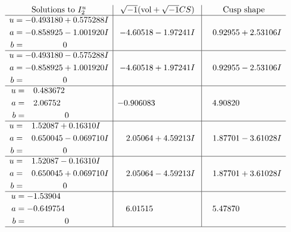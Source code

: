 \documentclass[1p]{elsarticle_modified}
\theoremstyle{definition}
\newcommand{\I}{\sqrt{-1}}
\begin{document}
$$\begin{array}{c|c|c}  
\text{Solutions to }I^u_{2}& \I (\text{vol} + \sqrt{-1}CS) & \text{Cusp shape}\\
 \hline 
\begin{aligned}
u &= -0.493180 + 0.575288 I \\
a &= -0.858925 - 1.001920 I \\
b &= \phantom{-0.000000 } 0\end{aligned}
 & -4.60518 - 1.97241 I & \phantom{-}0.92955 + 2.53106 I \\ \hline\begin{aligned}
u &= -0.493180 - 0.575288 I \\
a &= -0.858925 + 1.001920 I \\
b &= \phantom{-0.000000 } 0\end{aligned}
 & -4.60518 + 1.97241 I & \phantom{-}0.92955 - 2.53106 I \\ \hline\begin{aligned}
u &= \phantom{-}0.483672\phantom{ +0.000000I} \\
a &= \phantom{-}2.06752\phantom{ +0.000000I} \\
b &= \phantom{-0.000000 } 0\end{aligned}
 & -0.906083\phantom{ +0.000000I} & \phantom{-}4.90820\phantom{ +0.000000I} \\ \hline\begin{aligned}
u &= \phantom{-}1.52087 + 0.16310 I \\
a &= \phantom{-}0.650045 - 0.069710 I \\
b &= \phantom{-0.000000 } 0\end{aligned}
 & \phantom{-}2.05064 + 4.59213 I & \phantom{-}1.87701 - 3.61028 I \\ \hline\begin{aligned}
u &= \phantom{-}1.52087 - 0.16310 I \\
a &= \phantom{-}0.650045 + 0.069710 I \\
b &= \phantom{-0.000000 } 0\end{aligned}
 & \phantom{-}2.05064 - 4.59213 I & \phantom{-}1.87701 + 3.61028 I \\ \hline\begin{aligned}
u &= -1.53904\phantom{ +0.000000I} \\
a &= -0.649754\phantom{ +0.000000I} \\
b &= \phantom{-0.000000 } 0\end{aligned}
 & \phantom{-}6.01515\phantom{ +0.000000I} & \phantom{-}5.47870\phantom{ +0.000000I}\\
 \hline 
 \end{array}$$\newpage
\end{document}
